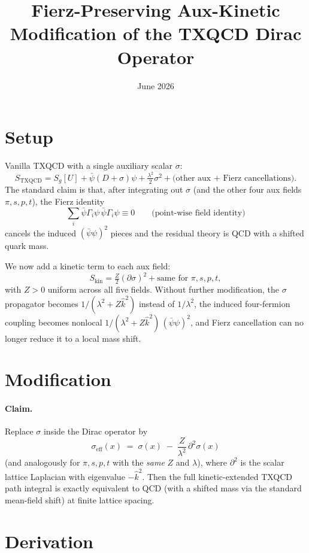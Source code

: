 \documentclass[11pt]{article}
\title{Fierz-Preserving Aux-Kinetic Modification of the TXQCD Dirac Operator}
\author{}
\date{June 2026}
\begin{document}
\maketitle

\section*{Setup}

Vanilla TXQCD with a single auxiliary scalar $\sigma$:
\[
S_{\text{TXQCD}} = S_g[U] + \bar\psi (D + \sigma) \psi + \tfrac{\lambda^2}{2}\sigma^2 + \text{(other aux + Fierz cancellations)}.
\]
The standard claim is that, after integrating out $\sigma$ (and the other four aux fields $\pi, s, p, t$), the Fierz identity
\[
\sum_i \bar\psi \Gamma_i \psi\, \bar\psi \Gamma_i \psi \equiv 0
\qquad\text{(point-wise field identity)}
\]
cancels the induced $(\bar\psi\psi)^2$ pieces and the residual theory is QCD with a shifted quark mass.

\medskip
We now add a kinetic term to each aux field:
\[
S_{\text{kin}} = \tfrac{Z}{2} (\partial \sigma)^2 + \text{same for } \pi, s, p, t,
\]
with $Z>0$ uniform across all five fields.  Without further modification, the $\sigma$ propagator becomes $1/(\lambda^2 + Z\hat k^2)$ instead of $1/\lambda^2$, the induced four-fermion coupling becomes nonlocal $1/(\lambda^2+Z\hat k^2)\,(\bar\psi\psi)^2$, and Fierz cancellation can no longer reduce it to a local mass shift.

\section*{Modification}

\paragraph{Claim.}  Replace $\sigma$ inside the Dirac operator by
\[
\boxed{
\sigma_{\text{eff}}(x) \;=\; \sigma(x) \;-\; \frac{Z}{\lambda^2}\, \partial^2 \sigma(x)
}
\]
(and analogously for $\pi, s, p, t$ with the \emph{same} $Z$ and $\lambda$), where $\partial^2$ is the scalar lattice Laplacian with eigenvalue $-\hat k^2$.  Then the full kinetic-extended TXQCD path integral is exactly equivalent to QCD (with a shifted mass via the standard mean-field shift) at finite lattice spacing.

\section*{Derivation}
\end{document}
